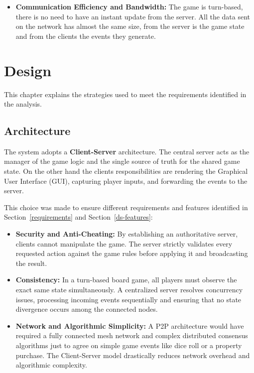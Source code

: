 \documentclass{scrartcl}
\begin{document}
\begin{itemize}
  \item \textbf{Communication Efficiency and Bandwidth:}
  The game is turn-based, there is no need to have an instant update from the server.
  All the data sent on the network has almost the same size, from the server is the game state and from the clients the events they generate.
\end{itemize}

\section{Design}\label{design}

This chapter explains the strategies used to meet the requirements identified in the analysis.

\subsection{Architecture}\label{architecture}
The system adopts a \textbf{Client-Server} architecture.
The central server acts as the manager of the game logic and the single source of truth for the shared game state.
On the other hand the clients responsibilities are rendering the Graphical User Interface (GUI),
capturing player inputs, and forwarding the events to the server.


This choice was made to ensure different requirements and features identified in Section~\ref{requirements} and Section~\ref{ds-features}:
\begin{itemize}
    \item \textbf{Security and Anti-Cheating:} By establishing an authoritative server, clients cannot manipulate the game.
    The server strictly validates every requested action against the game rules before applying it and broadcasting the result.
    \item \textbf{Consistency:} In a turn-based board game, all players must observe the exact same state simultaneously.
    A centralized server resolves concurrency issues, processing incoming events sequentially and ensuring that no state divergence occurs among the connected nodes.
    \item \textbf{Network and Algorithmic Simplicity:} A P2P architecture would have required a fully connected mesh network and
    complex distributed consensus algorithms just to agree on simple game events like dice roll or a property purchase.
    The Client-Server model drastically reduces network overhead and algorithmic complexity.
\end{itemize}
\end{document}
